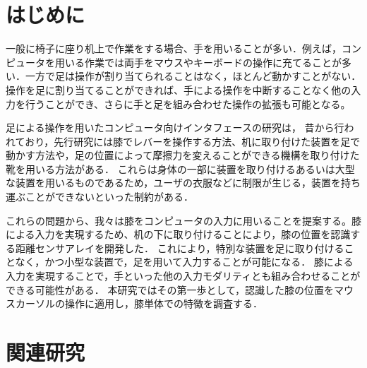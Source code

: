 \documentclass[submit, techrep]{ipsj}
\begin{document}
\section{はじめに}
一般に椅子に座り机上で作業をする場合、手を用いることが多い．例えば，コンピュータを用いる作業では両手をマウスやキーボードの操作に充てることが多い．一方で足は操作が割り当てられることはなく，ほとんど動かすことがない．操作を足に割り当てることができれば、手による操作を中断することなく他の入力を行うことができ、さらに手と足を組み合わせた操作の拡張も可能となる。\par
足による操作を用いたコンピュータ向けインタフェースの研究は，
昔から行われており，先行研究には膝でレバーを操作する方法\cite{1698228}、机に取り付けた装置を足で動かす方法\cite{Pearson:1986:MMD:22627.22392, Pearson:1988:EEP:57167.57169}や，足の位置によって摩擦力を変えることができる機構を取り付けた靴\cite{Horodniczy:2017:FHE:3025453.3025625}を用いる方法がある．
これらは身体の一部に装置を取り付けるあるいは大型な装置を用いるものであるため，ユーザの衣服などに制限が生じる，装置を持ち運ぶことができないといった制約がある．\par
これらの問題から、我々は膝をコンピュータの入力に用いることを提案する。膝による入力を実現するため、机の下に取り付けることにより，膝の位置を認識する距離センサアレイを開発した．
これにより，特別な装置を足に取り付けることなく，かつ小型な装置で，足を用いて入力することが可能になる．
膝による入力を実現することで，手といった他の入力モダリティとも組み合わせることができる可能性がある．
本研究ではその第一歩として，認識した膝の位置をマウスカーソルの操作に適用し，膝単体での特徴を調査する．



\section{関連研究}
\end{document}
